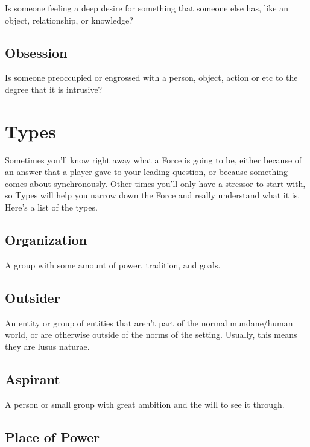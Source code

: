 \documentclass[
  oneside,
  statementpaper,
  9pt]{memoir}
\begin{document}
Is someone feeling a deep desire for something that someone else has,
like an object, relationship, or knowledge?

\hypertarget{obsession}{%
\subsection{Obsession}\label{obsession}}

Is someone preoccupied or engrossed with a person, object, action or etc
to the degree that it is intrusive?

\hypertarget{types}{%
\section{Types}\label{types}}

Sometimes you'll know right away what a Force is going to be, either
because of an answer that a player gave to your leading question, or
because something comes about synchronously. Other times you'll only
have a stressor to start with, so Types will help you narrow down the
Force and really understand what it is. Here's a list of the types.

\hypertarget{organization}{%
\subsection{Organization}\label{organization}}

A group with some amount of power, tradition, and goals.

\hypertarget{outsider}{%
\subsection{Outsider}\label{outsider}}

An entity or group of entities that aren't part of the normal
mundane/human world, or are otherwise outside of the norms of the
setting. Usually, this means they are lusus naturae.

\hypertarget{aspirant}{%
\subsection{Aspirant}\label{aspirant}}

A person or small group with great ambition and the will to see it
through.

\hypertarget{place-of-power-4}{%
\subsection{Place of Power}\label{place-of-power-4}}
\end{document}
